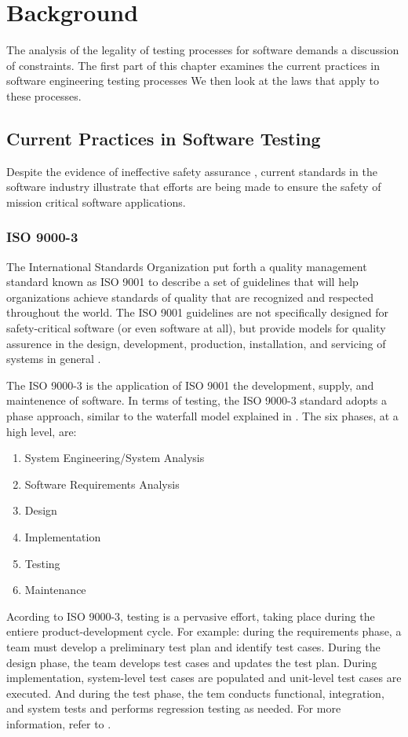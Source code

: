 \chapter{Background}\label{C:Background}
The analysis of the legality of testing processes for software demands a
discussion of constraints. The first part of this chapter examines the current
practices in software engineering testing processes We then look at the laws
that apply to these processes.

\section{Current Practices in Software Testing}
Despite the evidence of ineffective safety assurance \cite{Leveson93,Maisel05},
current standards in the software industry illustrate that efforts are being
made to ensure the safety of mission critical software applications.


\subsection{ISO 9000-3}
The International Standards Organization put forth a quality management standard
known as ISO 9001 to describe a set of guidelines that will help organizations
achieve standards of quality that are recognized and respected throughout the
world. The ISO 9001 guidelines are not specifically designed for safety-critical
software (or even software at all), but provide models for quality assurence
in the design, development, production, installation, and servicing of systems
in general \cite{Kehoe96}.

The ISO 9000-3 is the application of ISO 9001 the development, supply, and
maintenence of software. In terms of testing, the ISO 9000-3 standard adopts a
phase approach, similar to the waterfall model explained in \cite{Royce70}. The
six phases, at a high level, are:
\singlespace
\begin{enumerate}
  \item System Engineering/System Analysis
  \item Software Requirements Analysis
  \item Design
  \item Implementation
  \item Testing
  \item Maintenance
\end{enumerate}
\doublespace
Acording to ISO 9000-3, testing is a pervasive effort, taking place during the
entiere product-development cycle. For example: during the requirements phase, a
team must develop a preliminary test plan and identify test cases. During the
design phase, the team develops test cases and updates the test plan. During
implementation, system-level test cases are populated and unit-level test cases
are executed. And during the test phase, the tem conducts functional,
integration, and system tests and performs regression testing as needed. For
more information, refer to \cite{Kehoe96}.

